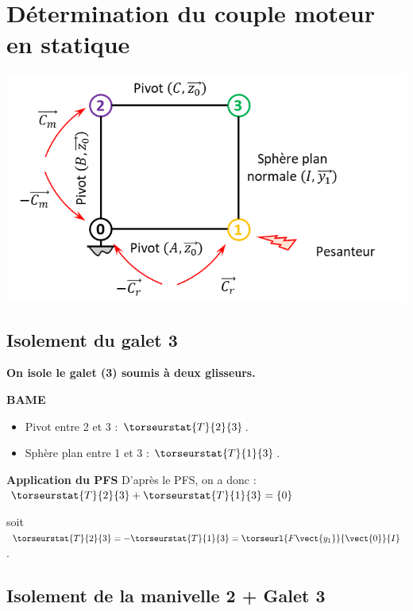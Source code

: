 %


\section{Détermination du couple moteur en statique}


\begin{center}
 \includegraphics[width=.95\textwidth]{images/fig_02}
\end{center}


\subsection{Isolement du galet 3}
\textbf{On isole le galet (3) soumis à deux glisseurs.}

\textbf{BAME}
\begin{itemize}
\item Pivot entre 2 et 3 : $\torseurstat{T}{2}{3}$.
\item Sphère plan entre 1 et 3 : $\torseurstat{T}{1}{3}$.
\end{itemize}

\textbf{Application du PFS}
D'après le PFS, on a donc :
$\torseurstat{T}{2}{3}+\torseurstat{T}{1}{3}= \{0\}$

soit $\torseurstat{T}{2}{3}=-\torseurstat{T}{1}{3}= \torseurl{F\vect{y_1}}{\vect{0}}{I}$.

\subsection{Isolement de la manivelle 2 + Galet 3}

